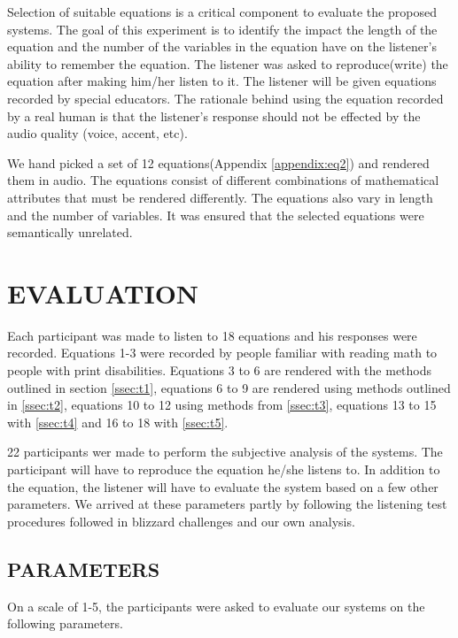 \documentclass{article}
\begin{document}
Selection  of suitable equations is a critical component to evaluate the proposed systems. The goal of this experiment is to identify the impact the length of the equation and the number of the variables in the equation have on the listener’s ability to remember the equation. The listener was asked to reproduce(write) the equation after making him/her listen to it. The listener will be given equations recorded by special educators. The rationale behind using the equation recorded by a real human is that the listener’s response should not be effected by the audio quality (voice, accent, etc). 


We hand picked a set of 12 equations(Appendix \ref{appendix:eq2}) and rendered them in audio. The equations consist of different combinations of mathematical attributes that must be rendered differently. The equations also vary in length and the number of variables. It was ensured that the selected equations were semantically unrelated.




 
\section{EVALUATION}
\label{sec:eval}

Each participant was made to listen to 18 equations and his responses were recorded. Equations 1-3 were recorded by people familiar with reading math to people with print disabilities. Equations 3 to 6 are rendered with the methods outlined in section \ref{ssec:t1}, equations 6 to 9 are rendered using methods outlined in \ref{ssec:t2}, equations 10 to 12 using methods from \ref{ssec:t3}, equations 13 to 15 with \ref{ssec:t4} and 16 to 18 with \ref{ssec:t5}.


22 participants wer made to perform the subjective analysis of the systems. The participant will have to reproduce the equation he/she listens to. In addition to the equation, the listener will have to evaluate the system based on a few other parameters. We arrived at these parameters partly by following the listening test procedures followed in blizzard challenges \cite{hinterleitner2011evaluation} and our own analysis.


\subsection{PARAMETERS}
\label{ssec:parameters}

On a scale of 1-5, the participants were asked to evaluate our systems on the following parameters.
\end{document}
